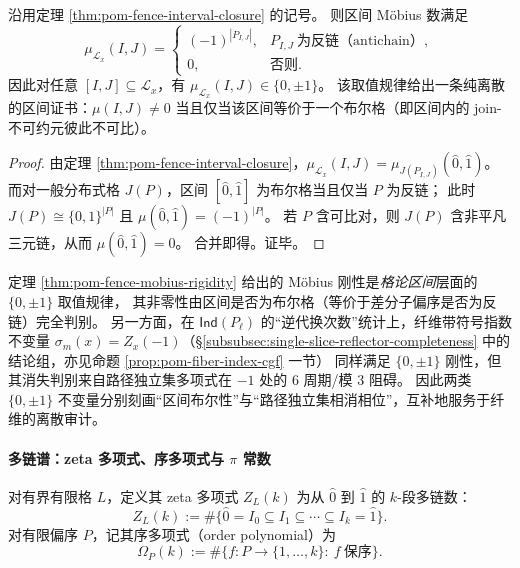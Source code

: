 \begin{theorem}\label{thm:pom-fence-mobius-rigidity}
沿用定理 \ref{thm:pom-fence-interval-closure} 的记号。
则区间 Möbius 数满足
\[
\mu_{\mathcal L_x}(I,J)=
\begin{cases}
(-1)^{|P_{I,J}|},& P_{I,J}\ \text{为反链（antichain）},\\
0,& \text{否则}.
\end{cases}
\]
因此对任意 \([I,J]\subseteq\mathcal L_x\)，有 \(\mu_{\mathcal L_x}(I,J)\in\{0,\pm 1\}\)。
该取值规律给出一条纯离散的区间证书：\(\mu(I,J)\neq 0\) 当且仅当该区间等价于一个布尔格（即区间内的 join-不可约元彼此不可比）。
\end{theorem}
\begin{proof}
由定理 \ref{thm:pom-fence-interval-closure}，\(\mu_{\mathcal L_x}(I,J)=\mu_{J(P_{I,J})}(\hat0,\hat1)\)。
而对一般分布式格 \(J(P)\)，区间 \([\hat0,\hat1]\) 为布尔格当且仅当 \(P\) 为反链；
此时 \(J(P)\cong \{0,1\}^{|P|}\) 且 \(\mu(\hat0,\hat1)=(-1)^{|P|}\)。
若 \(P\) 含可比对，则 \(J(P)\) 含非平凡三元链，从而 \(\mu(\hat0,\hat1)=0\)。
合并即得。证毕。
\end{proof}

\begin{remark}\label{rem:pom-fence-mobius-vs-signed-index}
定理 \ref{thm:pom-fence-mobius-rigidity} 给出的 Möbius 刚性是\emph{格论区间}层面的 \(\{0,\pm 1\}\) 取值规律，
其非零性由区间是否为布尔格（等价于差分子偏序是否为反链）完全判别。
另一方面，在 \(\mathsf{Ind}(P_\ell)\) 的“逆代换次数”统计上，纤维带符号指数不变量
\(\sigma_m(x)=Z_x(-1)\)（\S\ref{subsubsec:single-slice-reflector-completeness} 中的结论组，亦见命题 \ref{prop:pom-fiber-index-cgf} 一节）
同样满足 \(\{0,\pm 1\}\) 刚性，但其消失判别来自路径独立集多项式在 \(-1\) 处的 6 周期/模 \(3\) 阻碍。
因此两类 \(\{0,\pm 1\}\) 不变量分别刻画“区间布尔性”与“路径独立集相消相位”，互补地服务于纤维的离散审计。
\end{remark}

\paragraph{多链谱：zeta 多项式、序多项式与 \texorpdfstring{\(\pi\)}{pi} 常数}
\begin{definition}\label{def:pom-zeta-order-polynomial}
对有界有限格 \(L\)，定义其 zeta 多项式 \(Z_L(k)\) 为从 \(\hat0\) 到 \(\hat1\) 的 \(k\)-段多链数：
\[
Z_L(k):=\#\{\hat0=I_0\subseteq I_1\subseteq \cdots \subseteq I_k=\hat1\}.
\]
对有限偏序 \(P\)，记其序多项式（order polynomial）为
\[
\Omega_P(k):=\#\{f:P\to\{1,\dots,k\}:\ f \ \text{保序}\}.
\]
\end{definition}

